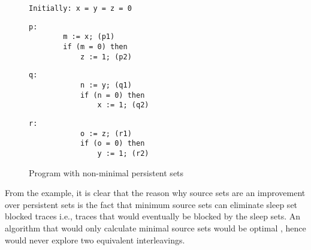 \begin{figure*}
    \begin{lstlisting}[frame=none,numbers=none]
        Initially: x = y = z = 0 
    \end{lstlisting}
    \begin{minipage}{0.3\textwidth}
      \begin{lstlisting}[frame=none, numbers=none]
        p:
        m := x; (p1)
        if (m = 0) then
            z := 1; (p2)
      \end{lstlisting}
    \end{minipage}
    \begin{minipage}{0.3\textwidth}
        \begin{lstlisting}[frame=none, numbers=none]
            q:
            n := y; (q1)
            if (n = 0) then
                x := 1; (q2)
        \end{lstlisting}
      \end{minipage}
      \begin{minipage}{0.3\textwidth}
        \begin{lstlisting}[frame=none, numbers=none]
            r:
            o := z; (r1)
            if (o = 0) then
                y := 1; (r2)
        \end{lstlisting}
      \end{minipage}
      \caption{Program with non-minimal persistent sets}
      \label{Non-minimal persistent sets}
  \end{figure*}

From the example, it is clear that the reason why source sets are an improvement over persistent sets is the fact that minimum source sets can eliminate
sleep set blocked traces i.e., traces that would eventually be blocked by the sleep sets. An algorithm that would only calculate minimal source sets would be optimal \cite{AbdullaAronisJohnssonSagonasDPOR2014}, hence
would never explore two equivalent interleavings.

